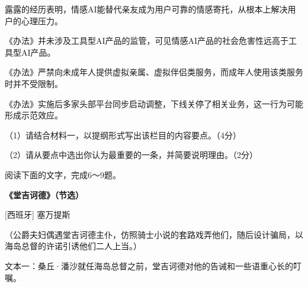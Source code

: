 \documentclass[11pt,a4paper]{ctexart}
\begin{document}
\begin{choices}
\item 露露的经历表明，情感AI能替代亲友成为用户可靠的情感寄托，从根本上解决用户的心理压力。
\item 《办法》并未涉及工具型AI产品的监管，可见情感AI产品的社会危害性远高于工具型AI产品。
\item 《办法》严禁向未成年人提供虚拟亲属、虚拟伴侣类服务，而成年人使用该类服务时并不受限制。
\item 《办法》实施后多家头部平台同步启动调整，下线关停了相关业务，这一行为可能形成示范效应。
\end{choices}


\par\vspace{2.2em}


\par\vspace{2.2em}


（1）请结合材料一，以提纲形式写出该栏目的内容要点。（4分）

\par\vspace{2.2em}

（2）请从要点中选出你认为最重要的一条，并简要说明理由。（2分）

\par\vspace{2.2em}

阅读下面的文字，完成6～9题。

\begin{center}{\bfseries 《堂吉诃德》（节选）}\par\vspace{0.15em}[西班牙] 塞万提斯\end{center}

{\ywstkaiti （公爵夫妇偶遇堂吉诃德主仆，仿照骑士小说的套路戏弄他们，随后设计骗局，以海岛总督的许诺引诱他们二人上当。）}

文本一：桑丘·潘沙就任海岛总督之前，堂吉诃德对他的告诫和一些语重心长的叮嘱。
\end{document}
